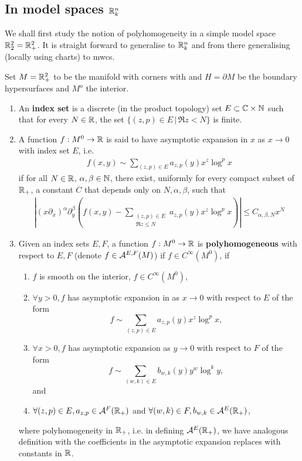 \documentclass{article}
\begin{document}
\subsection{In model spaces ${\mathbb R}^n_k$}
We shall first study the notion of polyhomogeneity in a simple model space ${\mathbb R}^2_2 = {\mathbb R}^2_+$. It is straight forward to generalise to ${\mathbb R}^n_k$ and from there generalising (locally using charts) to mwcs. 
\begin{fdefinition}
Set $M = {\mathbb R}_+^2$ to be the manifold with corners with and $H = \partial M$ be the boundary hypersurfaces and $M^o$ the interior. 
\begin{enumerate}
\item An \textbf{index set} is a discrete (in the product topology) set $E \subset {\ensuremath {\mathbb C}} \times {\ensuremath {\mathbb N}}$ such that for every $N \in {\ensuremath {\mathbb R}}$, the set $\{(z, p) \in E \, |\, \Re z < N\}$ is finite. 
\item A function $f: M^0 \to {\ensuremath {\mathbb R}}$ is said to have asymptotic expansion in $x$ as $x \to 0$ with index set $E$, i.e. 
\begin{align*}
f(x, y) \sim \sum_{(z, p) \in E} a_{z, p}(y) x^z \log^p x
\end{align*}
if for all $N \in {\ensuremath {\mathbb R}}$, $\alpha, \beta \in {\ensuremath {\mathbb N}}$, there exist, uniformly for every compact subset of ${\mathbb R}_+$, a constant $C$ that depends only on $N, \alpha, \beta$, such that 
\begin{align*}
\left | (x\partial_x)^\alpha \partial_y^\beta \left( f(x, y) -  \sum_{\substack{(z, p) \in E \\ \Re z \leq N}} a_{z, p}(y) x^z \log^p x \right ) \right | \leq C_{\alpha, \beta, N} x^N
\end{align*}
\item Given an index sets $E, F$, a function $f: M^0 \to {\ensuremath {\mathbb R}}$ is \textbf{polyhomogeneous} with respect to $E, F$ (denote $f \in {{\ensuremath {\cal A}}}^{E, F}(M)$) if $f \in C^\infty(M^0)$, if 
\begin{enumerate}
\item $f$ is smooth on the interior, $f \in C^\infty(M^0)$, 
\item $\forall y > 0, f$ has asymptotic expansion in as $x \to 0$ with respect to $E$ of the form  $$f \sim \sum_{(z, p) \in E} a_{z, p}(y) x^z \log^p x, $$ 
\item $\forall x > 0, f$ has asymptotic expansion as $y \to 0$ with respect to $F$ of the form  $$f \sim \sum_{(w, k) \in E} b_{w, k}(y) y^w \log^k y,$$ and
\item $\forall (z, p) \in E, a_{z, p} \in {\ensuremath {\cal A}}^F({\mathbb R}_+)$ and $\forall (w, k) \in F, b_{w, k} \in {\ensuremath {\cal A}}^E({\mathbb R}_+)$,
\end{enumerate}
where polyhomogeneity in ${\mathbb R}_+$, i.e. in defining ${\cal A}^E({\mathbb R}_+)$, we have analogous definition with the coefficients in the asymptotic expansion replaces with constants in ${\mathbb R}$. 
\end{enumerate}
\end{fdefinition}
\end{document}
